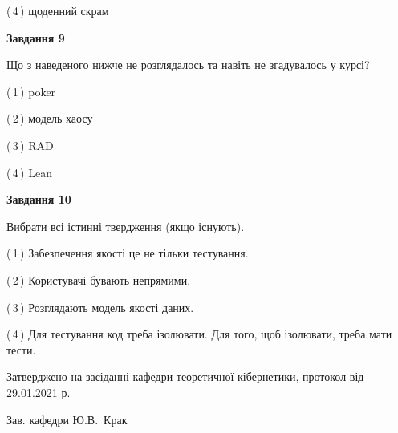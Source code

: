 \documentclass[10pt, ukrainian]{article}
\begin{document}
{\begin {large}
(\,4\,) щоденний скрам%


{\begin {center}\textbf{Завдання 9}\end {center}}\par
Що з наведеного нижче не розглядалось та навіть не згадувалось у курсі?\par
\vspace{2mm}



(\,1\,) poker%



(\,2\,) модель хаосу%



(\,3\,) RAD%



(\,4\,) Lean%


{\begin {center}\textbf{Завдання 10}\end {center}}\par
Вибрати всі істинні твердження (якщо існують).\par
\vspace{2mm}



(\,1\,) Забезпечення якості це не тільки тестування.%



(\,2\,) Користувачі бувають непрямими.%



(\,3\,) Розглядають модель якості даних.%



(\,4\,) Для тестування код треба ізолювати. Для того, щоб ізолювати, треба мати тести.%



\end {large}}
{\vspace{5mm}\smallskip \begin {small} Затверджено на засіданні кафедри теоретичної кібернетики, протокол  від   29.01.2021 р.\par\smallskip\smallskip
{\parbox {6.5 cm}{Зав. кафедри \dotfill Ю.В.~Крак}} \end{small}}
\newpage
\end{document}
